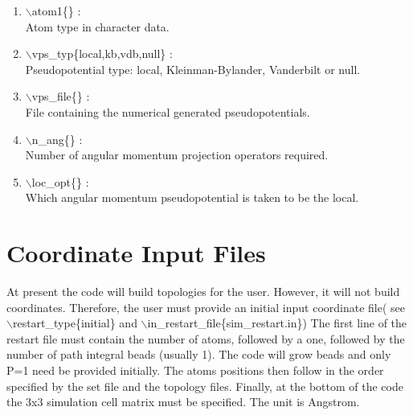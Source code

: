 \documentclass[12pt,titlepage]{article}
\begin{document}
\begin{enumerate}

 \vspace{0.15in} 
 \item  $\backslash$atom1\{\} : \\
    Atom type in character data.

 \vspace{0.15in} 
 \item  $\backslash$vps\_typ\{local,kb,vdb,null\} : \\
    Pseudopotential type: local, Kleinman-Bylander, Vanderbilt or null.

 \vspace{0.15in} 
 \item  $\backslash$vps\_file\{\} : \\
    File containing the numerical generated pseudopotentials.

 \vspace{0.15in} 
 \item  $\backslash$n\_ang\{\} : \\
    Number of angular momentum projection operators required.

 \vspace{0.15in} 
 \item  $\backslash$loc\_opt\{\} : \\
    Which angular momentum pseudopotential is taken to be the local.

\end{enumerate}

\newpage

\section{\bf Coordinate Input Files} 

At present the code will build topologies for the user. However,
it will not build coordinates. Therefore, the user must provide
an initial input coordinate file( see $\backslash$restart\_type\{initial\}
and $\backslash$in\_restart\_file\{sim\_restart.in\})
The first line of the restart file must contain the number of atoms,
followed by a one, followed by the number of path integral beads 
(usually 1). The code will grow beads and only P=1 need be provided
initially. The atoms positions then follow in the order specified by
the set file and the topology files. Finally, at the bottom of
the code the 3x3 simulation cell matrix must be specified.
The unit is Angstrom.
\end{document}
